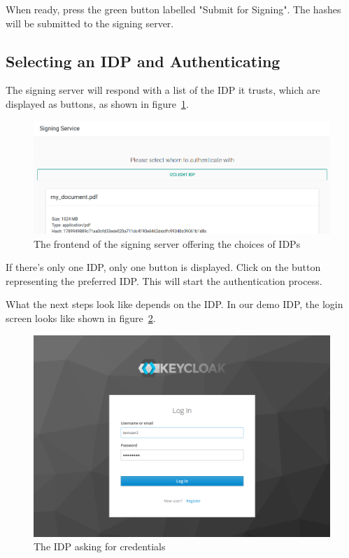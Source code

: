 When ready, press the green button labelled "Submit for Signing".
The hashes will be submitted to the signing server.

\subsection{Selecting an IDP and Authenticating}\label{subsec:selecting-an-idp-and-authenticating}
The signing server will respond with a list of the \gls{IDP} it trusts,
which are displayed as buttons, as shown in figure~\ref{fig:userguide4}.


\begin{figure}[H]
    \begin{center}
        \includegraphics[width=\linewidth]{images/userguide_sign_4.png}
    \end{center}
    \caption{The frontend of the signing server offering the choices of IDPs}
    \label{fig:userguide4}
\end{figure}

If there's only one \gls{IDP}, only one button is displayed.
Click on the button representing the preferred \gls{IDP}.
This will start the authentication process.

What the next steps look like depends on the \gls{IDP}.
In our demo \gls{IDP}, the login screen looks like shown in figure~\ref{fig:userguide5}.

\begin{figure}[H]
    \begin{center}
        \includegraphics[width=\linewidth]{images/userguide_sign_5.png}
    \end{center}
    \caption{The IDP asking for credentials}
    \label{fig:userguide5}
\end{figure}

